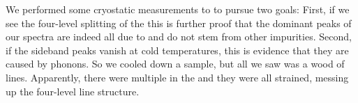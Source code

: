 		\begin{figure}[tp]
			\begin{subfigure}[t]{ 0.49\linewidth}
				\centering
				\caption{}
				\label{subfig::roomtep2}
			\end{subfigure}
			\hfill
			\begin{subfigure}[t]{ 0.49\linewidth}
				\centering
				\caption{}
				\label{subfig::cryo2}
			\end{subfigure}
			\caption{}
			\label{fig::rt_vs_cryo2}
		\end{figure}
		
		We performed some cryostatic measurements to to pursue two goals:
		First, if we see the four-level splitting of the \ZPL this is further proof that the dominant peaks of our spectra are indeed all due to \sivs and do not stem from other impurities.
		Second, if the sideband peaks vanish at cold temperatures, this is evidence that they are caused by phonons.
		So we cooled down a sample, but all we saw was a wood of lines.
		Apparently, there were multiple \sivs in the \nds and they were all strained, messing up the four-level line structure.